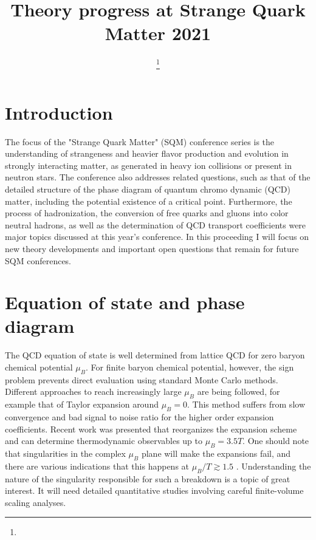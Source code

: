 \documentclass{webofc}
\begin{document}
%
\title{Theory progress at Strange Quark Matter 2021}

%
%

\author{ \fnsep\thanks{}
}


%
\maketitle
%
\vspace{-0.5cm}
\section{Introduction}
\label{intro}
The focus of the "Strange Quark Matter" (SQM) conference series is the understanding of strangeness and heavier flavor production and evolution in strongly interacting matter, as generated in heavy ion collisions or present in neutron stars. The conference also addresses related questions, such as that of the detailed structure of the phase diagram of quantum chromo dynamic (QCD) matter, including the potential existence of a critical point. Furthermore, the process of hadronization, the conversion of free quarks and gluons into color neutral hadrons, as well as the determination of QCD transport coefficients were major topics discussed at this year's conference. In this proceeding I will focus on new theory developments and important open questions that remain for future SQM conferences.

\section{Equation of state and phase diagram}
\label{sec-eos}
The QCD equation of state is well determined from lattice QCD for zero baryon chemical potential $\mu_B$. For finite baryon chemical potential, however, the sign problem prevents direct evaluation using standard Monte Carlo methods. Different approaches to reach increasingly large $\mu_B$ are being followed, for example that of Taylor expansion around $\mu_B=0$. This method suffers from slow convergence and bad signal to noise ratio for the higher order expansion coefficients. Recent work was presented that reorganizes the expansion scheme \cite{Borsanyi:2021sxv} and can determine thermodynamic observables up to $\mu_B=3.5 T$. One should note that singularities in the complex $\mu_B$ plane will make the expansions fail, and there are various indications that this happens at $\mu_B/T\gtrsim 1.5$ \cite{Mondal:2021jxk}. Understanding the nature of the singularity responsible for such a breakdown is a topic of great interest. It will need detailed quantitative studies involving careful finite-volume scaling analyses.
\end{document}
